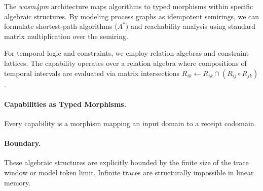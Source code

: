 The \textit{wasm4pm} architecture maps algorithms to typed morphisms within specific algebraic structures. By modeling process graphs as idempotent semirings, we can formulate shortest-path algorithms ($A^*$) and reachability analysis using standard matrix multiplication over the semiring.

For temporal logic and constraints, we employ relation algebras and constraint lattices. The  capability operates over a relation algebra where compositions of temporal intervals are evaluated via matrix intersections $R_{ik} \leftarrow R_{ik} \cap (R_{ij} \circ R_{jk})$.

\paragraph{Capabilities as Typed Morphisms.}
Every capability is a morphism mapping an input domain to a receipt codomain.
\paragraph{Boundary.}
These algebraic structures are explicitly bounded by the finite size of the trace window or model token limit. Infinite traces are structurally impossible in linear memory.
